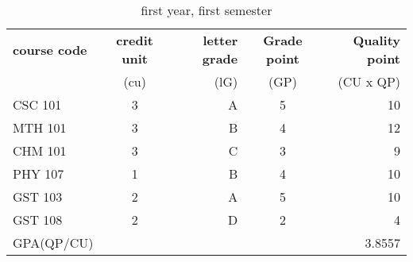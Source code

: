 \documentclass{article}
\begin{document}
	\begin{table}[h!]
		\begin{center}
			\caption{first year, first semester}
			\label{tab:table1}
			\begin{tabular}{l|c|r|c|r}
				\textbf{course code} & \textbf{credit unit} & \textbf{letter grade} &\textbf{Grade point} & \textbf{Quality point}\\
				&(cu) &(lG) & (GP) & (CU x QP)\\
				\hline
				CSC 101 & 3 & A & 5 & 10\\
				MTH 101 & 3 & B & 4 & 12\\
				CHM 101 & 3 & C & 3 & 9\\
				PHY 107 & 1 & B & 4 & 10\\
				GST 103 & 2 & A & 5 & 10\\
				GST 108 & 2 & D & 2 & 4\\
				GPA(QP/CU) & & & &3.8557
			\end{tabular}
		\end{center}
	\end{table}
\end{document}
